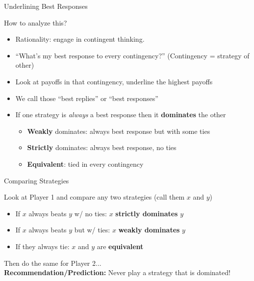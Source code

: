 \begin{frame}{Underlining Best Responses}
\begin{center}
    \begin{matrixgame}[top={Split, Steal}, left={Split, Steal}, player names={Sarah, Steven}]
\end{matrixgame}
\end{center}
How to analyze this?
\begin{itemize}
    \item Rationality: engage in contingent thinking.
    \item ``What's my best response to every contingency?'' (Contingency = strategy of other)
    \item Look at payoffs in that contingency, underline the highest payoffs
    \item We call those ``best replies'' or ``best responses''
    \item If one strategy is \textit{always} a best response then it \textbf{dominates} the other
    \begin{itemize}
        \item \textbf{Weakly} dominates: always best response but with some ties
        \item \textbf{Strictly} dominates: always best response, no ties
        \item \textbf{Equivalent}: tied in every contingency
    \end{itemize}
\end{itemize}
    
\end{frame}

\begin{frame}{Comparing Strategies}
\centering
\begin{matrixgame}[top={L, C, R}, left={A, B, C, D}, player names={Player 1, Player 2}]
\end{matrixgame}
\bsk
\raggedright
Look at Player 1 and compare any two strategies (call them $x$ and $y$)
\begin{itemize}
    \item If $x$ always beats $y$ w/ no ties: \hspace{0.42in} $x$ \textbf{strictly dominates} $y$
    \item If $x$ always beats $y$ but w/ ties: \hspace{0.40in} $x$ \textbf{weakly dominates} $y$
    \item If they always tie: \hspace{1.2in} $x$ and $y$ are \textbf{equivalent}
\end{itemize}
Then do the same for Player 2...\\
\textbf{Recommendation/Prediction:} Never play a strategy that is dominated!
\end{frame}

